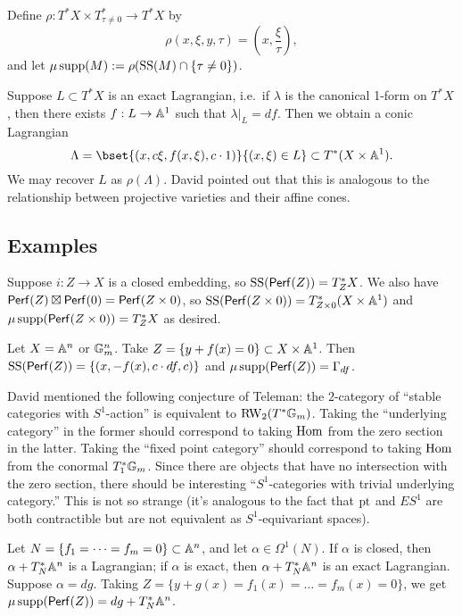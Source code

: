 \documentclass{article}
\begin{document}
Define $\rho: T^* X \times T^*_{\tau \neq 0} \to T^* X$ by
\[
	\rho(x, \xi, y, \tau) = \left(x, \frac{\xi}{\tau} \right),
\]
and let $\mu\supp(M) := \rho(\SSop(M) \cap \{ \tau \neq 0 \})$.

Suppose $L \subset T^* X$ is an exact Lagrangian, i.e.\ if $\lambda$ is the canonical 1-form on $T^* X$, then there exists $f: L \to \AA^1$ such that $\lambda|_L = df$.
Then we obtain a conic Lagrangian
\[
	\Lambda = \bset{(x, c \xi, f(x, \xi), c \cdot 1)}{(x, \xi) \in L} \subset T^*(X \times \AA^1).
\]
We may recover $L$ as $\rho(\Lambda)$.
David pointed out that this is analogous to the relationship between projective varieties and their affine cones.

\subsection{Examples}

\begin{ex}
	Suppose $i: Z \to X$ is a closed embedding, so $\SSop(\Perf(Z)) = T^*_Z X$.
	We also have $\Perf(Z) \boxtimes \Perf(0) = \Perf(Z \times 0)$, so $\SSop(\Perf(Z \times 0)) = T^*_{Z \times 0}(X \times \AA^1)$ and $\mu\supp(\Perf(Z \times 0)) = T^*_Z X$ as desired.
\end{ex}

\begin{ex}
	Let $X = \AA^n$ or $\GG_m^n$.
	Take $Z = \{ y + f(x) = 0 \} \subset X \times \AA^1$.
	Then $\SSop(\Perf(Z)) = \{ (x, -f(x), c \cdot df, c) \}$ and $\mu\supp(\Perf(Z)) = \Gamma_{df}$.
\end{ex}

\begin{rmk}
	David mentioned the following conjecture of Teleman: the $2$-category of ``stable categories with $S^1$-action'' is equivalent to $\RW_2(T^* \GG_m)$.
	Taking the ``underlying category'' in the former should correspond to taking $\Hom$ from the zero section in the latter.
	Taking the ``fixed point category'' should correspond to taking $\Hom$ from the conormal $T^*_1 \GG_m$.
	Since there are objects that have no intersection with the zero section, there should be interesting ``$S^1$-categories with trivial underlying category.''
	This is not so strange (it's analogous to the fact that $\pt$ and $ES^1$ are both contractible but are not equivalent as $S^1$-equivariant spaces).
\end{rmk}

\begin{ex}
	Let $N = \{ f_1 = \dots = f_m = 0 \} \subset \AA^n$, and let $\alpha \in \Omega^1(N)$.
	If $\alpha$ is closed, then $\alpha + T^*_N \AA^n$ is a Lagrangian; if $\alpha$ is exact, then $\alpha + T^*_N \AA^n$ is an exact Lagrangian.
	Suppose $\alpha = dg$.
	Taking $Z = \{ y + g(x) = f_1(x) = \dots = f_m(x) = 0 \}$, we get $\mu\supp(\Perf(Z)) = dg + T^*_N \AA^n$.
\end{ex}
\end{document}
